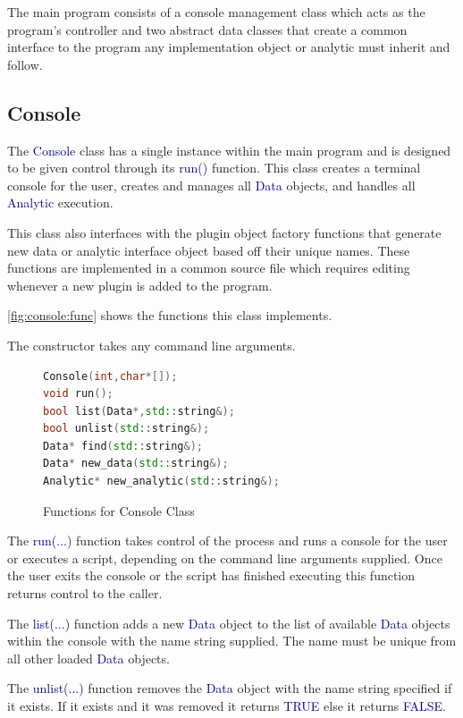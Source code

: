 \documentclass[10pt]{article}
\providecommand{\h}[1]{\textcolor{darkblue}{#1}}
\begin{document}
The main program consists of a console management class which acts as the 
program's controller and two abstract data classes that create a common 
interface to the program any implementation object or analytic must inherit and 
follow.

\subsection{Console}

The \h{Console} class has a single instance within the main program and is 
designed to be given control through its \h{run()} 
function. This class creates a terminal console for the user, creates and 
manages all \h{Data} objects, and handles all \h{Analytic} execution.

This class also interfaces with the plugin object factory functions that 
generate new data or analytic interface object based off their unique names. 
These functions are implemented in a common source file which requires editing 
whenever a new plugin is added to the program.

\autoref{fig:console:func} shows the functions this class implements.

The constructor takes any command line arguments.

\begin{figure}[H]
\begin{mdframed}[style=functions]
\begin{lstlisting}[language=C++]
Console(int,char*[]);
void run();
bool list(Data*,std::string&);
bool unlist(std::string&);
Data* find(std::string&);
Data* new_data(std::string&);
Analytic* new_analytic(std::string&);
\end{lstlisting}
\end{mdframed}
\caption{Functions for Console Class}
\label{fig:console:func}
\end{figure}

The \h{run(...)} function takes control of the process and runs a console for 
the user or executes a script, depending on the command line arguments 
supplied. Once the user exits the console or the script has finished executing 
this function returns control to the caller.

The \h{list(...)} function adds a new \h{Data} object to the list of 
available \h{Data} objects within the console with the name string supplied. 
The name must be unique from all other loaded \h{Data} objects.

The \h{unlist(...)} function removes the \h{Data} object with the name 
string specified if it exists. If it exists and it was removed it returns 
\h{TRUE} else it returns \h{FALSE}.
\end{document}
